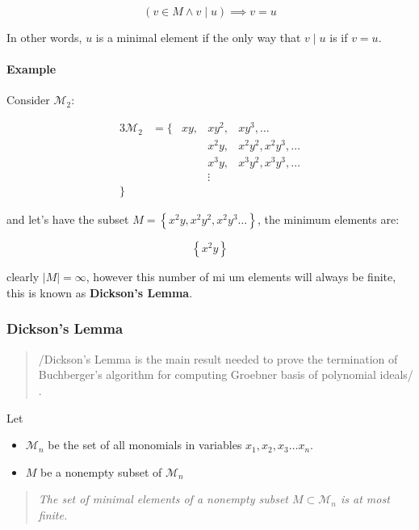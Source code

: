 \documentclass[a4paper,11pt,twoside]{article}
\begin{document}
\[
    \left(v \in M \land v \mid u\right) \implies v = u
    \]

In other words, \(u\) is a minimal element if the only way that \(v
    \mid u\) is if \(v = u\).


\paragraph{Example}
\label{sec:orgef073aa}

Consider \(\mathcal{M}_2\):

\begin{alignat}{3}
  \mathcal{M}_2 &= \{&x  y, &x  y^2, &x  y^3, \ldots         \\
                &    &      &x^2y,   &x^2y^2, x^2y^3, \ldots \\
                &    &      &x^3y,   &x^3y^2, x^3y^3, \ldots \\
                &    &      & \vdots &                       \\
		  \}
\end{alignat}

and let's have the subset \(M = \left\{ x^2y, x^2y^2, x^2y^3 \ldots
     \right\}\), the minimum elements are:

\[
           \left\{x^2y\right\}
     \]


clearly \(\left\lvert M \right\rvert = \infty\), however this number of
mi \centernot\implies um elements will always be finite, this is known as
\textbf{Dickson's Lemma}.

\subsubsection{Dickson's Lemma}
\label{sec:orga0a8af0}

\begin{quote}
/Dickson's Lemma is the main result needed to prove the termination
of Buchberger's algorithm for computing Groebner basis of polynomial
ideals/ \cite{martin-mateosFormalProofDickson2003}.
\end{quote}

Let
\begin{itemize}
\item \(\mathcal{M}_n\) be the set of all monomials in variables \(x_1, x_2, x_3 \ldots x_n\).
\item \(M\) be a nonempty subset of \(\mathcal{M}_n\)
\end{itemize}

\begin{quote}
\emph{The set of minimal elements of a nonempty subset \(M \subset
    \mathcal{M}_n\) is at most finite.}
\end{quote}
\end{document}
